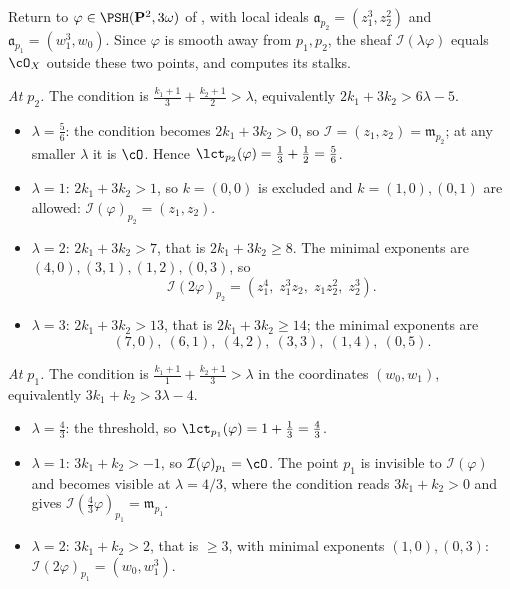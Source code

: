 \begin{example}
\label{ex:ch51-p2-ideals}
Return to \(\varphi\in\PSH(\mathbf P^2,3\omega)\) of
, with local ideals
\(\mathfrak a_{p_2}=(z_1^3,z_2^2)\) and
\(\mathfrak a_{p_1}=(w_1^3,w_0)\).  Since \(\varphi\) is smooth away from
\(p_1,p_2\), the sheaf \(\mathcal I(\lambda\varphi)\) equals \(\cO_X\)
outside these two points, and  computes its stalks.

\emph{At \(p_2\).}  The condition is
\(\frac{k_1+1}{3}+\frac{k_2+1}{2}>\lambda\), equivalently
\(2k_1+3k_2>6\lambda-5\).
\begin{itemize}
\item \(\lambda=\tfrac56\): the condition becomes \(2k_1+3k_2>0\), so
      \(\mathcal I=(z_1,z_2)=\mathfrak m_{p_2}\); at any smaller
      \(\lambda\) it is \(\cO\).  Hence
      \(\lct_{p_2}(\varphi)=\tfrac13+\tfrac12=\tfrac56\).
\item \(\lambda=1\): \(2k_1+3k_2>1\), so \(k=(0,0)\) is excluded and
      \(k=(1,0),(0,1)\) are allowed:
      \(\mathcal I(\varphi)_{p_2}=(z_1,z_2)\).
\item \(\lambda=2\): \(2k_1+3k_2>7\), that is \(2k_1+3k_2\geq8\).  The
      minimal exponents are \((4,0),(3,1),(1,2),(0,3)\), so
      \[
       \mathcal I(2\varphi)_{p_2}
       =(z_1^4,\;z_1^3z_2,\;z_1z_2^2,\;z_2^3).
      \]
\item \(\lambda=3\): \(2k_1+3k_2>13\), that is \(2k_1+3k_2\geq14\); the
      minimal exponents are
      \[
       (7,0),\ (6,1),\ (4,2),\ (3,3),\ (1,4),\ (0,5).
      \]
\end{itemize}

\emph{At \(p_1\).}  The condition is
\(\frac{k_1+1}{1}+\frac{k_2+1}{3}>\lambda\) in the coordinates
\((w_0,w_1)\), equivalently \(3k_1+k_2>3\lambda-4\).
\begin{itemize}
\item \(\lambda=\tfrac43\): the threshold, so
      \(\lct_{p_1}(\varphi)=1+\tfrac13=\tfrac43\).
\item \(\lambda=1\): \(3k_1+k_2>-1\), so
      \(\mathcal I(\varphi)_{p_1}=\cO\).  The point \(p_1\) is invisible to \(\mathcal I(\varphi)\) and becomes
visible at \(\lambda=4/3\), where the condition reads \(3k_1+k_2>0\) and
gives \(\mathcal I(\tfrac43\varphi)_{p_1}=\mathfrak m_{p_1}\).
\item \(\lambda=2\): \(3k_1+k_2>2\), that is \(\geq3\), with minimal
      exponents \((1,0),(0,3)\):
      \(\mathcal I(2\varphi)_{p_1}=(w_0,w_1^3)\).
\end{itemize}


\end{example}
